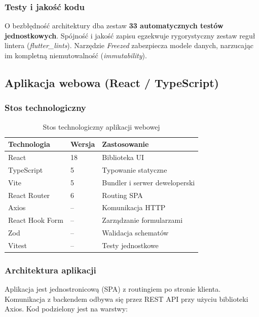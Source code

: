\documentclass[12pt,a4paper]{article}
\begin{document}
\subsubsection{Testy i jako\'s\'c kodu}

O bezb\l{}\k{e}dno\'s\'c architektury dba zestaw \textbf{33 automatycznych test\'ow jednostkowych}. Sp\'ojno\'s\'c i jako\'s\'c zapisu egzekwuje rygorystyczny zestaw regu\l{} lintera (\textit{flutter\_lints}). Narz\k{e}dzie \textit{Freezed} zabezpiecza modele danych, narzucaj\k{a}c im kompletn\k{a} niemutowalno\'s\'c (\textit{immutability}).

\subsection{Aplikacja webowa (React / TypeScript)}

\subsubsection{Stos technologiczny}

\begin{table}[htbp]
\centering
\caption{Stos technologiczny aplikacji webowej}
\label{tab:stos_web}
\vspace{0.3em}
\begin{tabular}{@{}lll@{}}
\toprule
\textbf{Technologia} & \textbf{Wersja} & \textbf{Zastosowanie} \\
\midrule
React & 18 & Biblioteka UI \\
TypeScript & 5 & Typowanie statyczne \\
Vite & 5 & Bundler i serwer deweloperski \\
React Router & 6 & Routing SPA \\
Axios & -- & Komunikacja HTTP \\
React Hook Form & -- & Zarz\k{a}dzanie formularzami \\
Zod & -- & Walidacja schemat\'ow \\
Vitest & -- & Testy jednostkowe \\
\bottomrule
\end{tabular}
\end{table}

\subsubsection{Architektura aplikacji}

Aplikacja jest jednostronicow\k{a} (SPA) z routingiem po stronie klienta. Komunikacja z backendem odbywa si\k{e} przez REST API przy u\.zyciu biblioteki Axios. Kod podzielony jest na warstwy:
\end{document}
